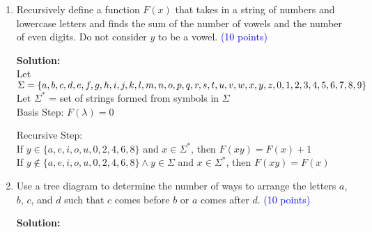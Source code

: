\documentclass{article}
\newcommand{\pt}[1]{\textcolor{blue}{(#1 points)}}
\newenvironment{solution}
{
\par
\color{blue}
\textbf{Solution:}
}
{
\par
}
\begin{document}
\begin{enumerate}
\begin{solution}
The amount of positive integers with 5 or less digits that are even or divisible by 5 and do not contain any repeated digits is 19654.

\textbf{NOTE: It may seem easier to just say $P^9_4 \cdot 6$ is the number of 5 AND 4 digit numbers since whenever we have a leading 0 it's just a 4 digit number. This is WRONG, because it misses cases where any other digit is 0 (i.e. 1230, 1204).}

\end{solution}

\item Recursively define a function $F(x)$ that takes in a string of numbers and lowercase letters and finds the sum of the number of vowels and the number of even digits. Do not consider $y$ to be a vowel. \pt{10}
\begin{solution}\\
Let $\Sigma = \{a, b, c, d, e, f, g, h, i, j, k, l, m, n, o, p, q, r, s, t, u, v, w, x, y, z,\\ 0, 1, 2, 3, 4, 5, 6, 7, 8, 9\}$\\
Let $\Sigma^*$ = set of strings formed from symbols in $\Sigma$\\

Basis Step: $F(\lambda) = 0$

Recursive Step:\\
If $y \in \{a, e, i, o, u, 0, 2, 4, 6, 8\}$ and $x \in \Sigma^*$, then $F(xy) = F(x) + 1$\\
If $y \not\in \{a, e, i, o, u, 0, 2, 4, 6, 8\} \land y \in \Sigma$ and $x \in \Sigma^*$, then $F(xy) = F(x)$
\end{solution}

\item Use a tree diagram to determine the number of ways to arrange the letters $a$, $b$, $c$, and $d$ such that $c$ comes before $b$ or $a$ comes after $d$. \pt{10}
\begin{solution}


\end{solution}
\end{enumerate}
\end{document}
